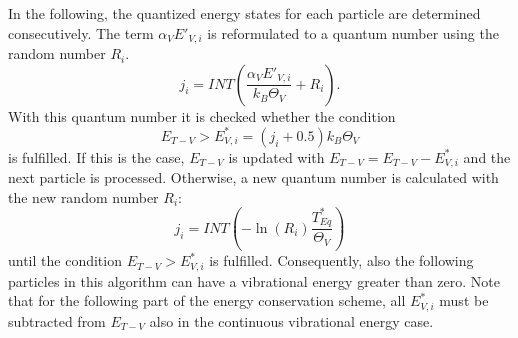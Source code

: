 \documentclass[aip,pof,amsmath,amssymb,preprint]{revtex4-1}
\begin{document}
In the following, the quantized energy states for each particle are determined consecutively.
The term $\alpha_VE'_{V,i}$ is reformulated to a quantum number using the random number $R_i$.
\begin{equation}
j_i=INT\left(\frac{\alpha_VE'_{V,i}}{k_B \Theta_V}+R_i\right).
\end{equation}
With this quantum number it is checked whether the condition 
\begin{equation}
E_{T-V}>E^*_{V,i}=(j_i+0.5)k_B \Theta_V
\end{equation} 
is fulfilled. If this is the case, $E_{T-V}$ is updated with $E_{T-V}=E_{T-V}-E^*_{V,i}$
and the next particle is processed.
Otherwise, a new quantum number is calculated with the new random number $R_i$:
\begin{equation}
j_i=INT\left(-\ln(R_i)\frac{T^*_{Eq}}{\Theta_V}\right)
\end{equation}
until the condition $E_{T-V}>E^*_{V,i}$ is fulfilled.
Consequently, also the following particles in this algorithm can have a vibrational energy greater than zero. Note that for the following part of the energy conservation scheme, 
all $E^*_{V,i}$ must be subtracted from $E_{T-V}$ also in the continuous vibrational energy case.
\end{document}
